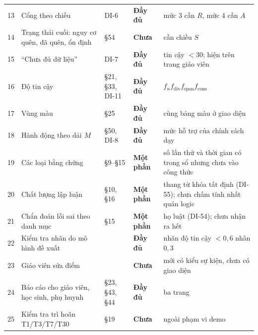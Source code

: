 \begin{table}[tp]
\begin{tabular}{@{}r>{\raggedright\arraybackslash}p{5.6cm}>{\raggedright\arraybackslash}p{2.2cm}>{\raggedright\arraybackslash}p{1.7cm}>{\raggedright\arraybackslash}p{5.8cm}@{}}
13 & Cổng theo chiều & DI-6 & \textcolor{zoneA}{\textbf{Đầy đủ}} & mức 3 cần $R$, mức 4 cần $A$ \\
14 & Trạng thái cuối: nguy cơ quên, đã quên, ổn định & §54 & \textcolor{zoneE}{\textbf{Chưa}} & cần chiều $S$ \\
15 & ``Chưa đủ dữ liệu'' & DI-7 & \textcolor{zoneA}{\textbf{Đầy đủ}} & tin cậy $<30$; hiện trên trang giáo viên \\
16 & Độ tin cậy & §21, §33, DI-11 & \textcolor{zoneA}{\textbf{Đầy đủ}} & $f_n f_{\text{div}} f_{\text{span}} f_{\text{cons}}$ \\
17 & Vùng màu & §25 & \textcolor{zoneA}{\textbf{Đầy đủ}} & cùng bảng màu ở giao diện \\
18 & Hành động theo dải $M$ & §50, DI-8 & \textcolor{zoneA}{\textbf{Đầy đủ}} & mức hỗ trợ của chính sách dạy \\
19 & Các loại bằng chứng & §9--§15 & \textcolor{llm}{\textbf{Một phần}} & số lần thử và thời gian có trong sổ nhưng chưa vào công thức \\
20 & Chất lượng lập luận & §10, §16 & \textcolor{llm}{\textbf{Một phần}} & thang từ khóa tất định (DI-55); chưa chấm tính nhất quán logic \\
21 & Chẩn đoán lỗi sai theo danh mục & §15 & \textcolor{llm}{\textbf{Một phần}} & 14 họ luật (DI-54); chưa nhận ra hết \\
22 & Kiểm tra nhãn do mô hình đề xuất & 26.5 & \textcolor{zoneA}{\textbf{Đầy đủ}} & nhãn độ tin cậy $<0{,}6$ nhân $0{,}3$ \\
23 & Giáo viên sửa điểm & 26.6 & \textcolor{zoneE}{\textbf{Chưa}} & mới có kiểu sự kiện, chưa có giao diện \\
24 & Báo cáo cho giáo viên, học sinh, phụ huynh & §23, §43, §44 & \textcolor{zoneA}{\textbf{Đầy đủ}} & ba trang \\
25 & Kiểm tra trì hoãn T1/T3/T7/T30 & §19 & \textcolor{zoneE}{\textbf{Chưa}} & ngoài phạm vi demo \\
\bottomrule
\end{tabular}
\end{table}

